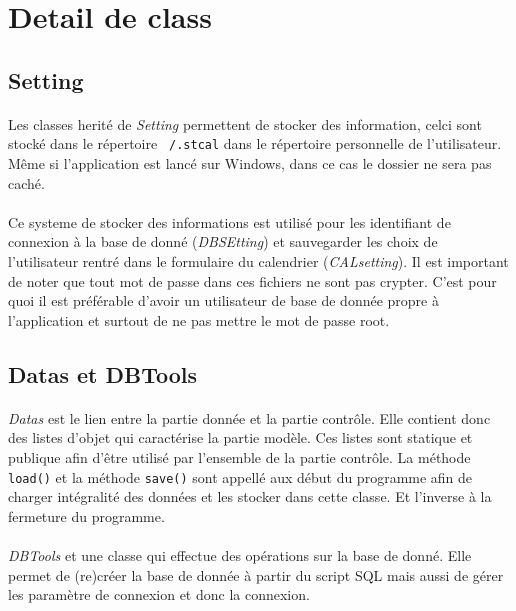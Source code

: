 \documentclass[a4paper,10pt]{report}
\begin{document}
	\section{Detail de class}

		\subsection{Setting}

			\paragraph*{}
			Les classes herité de \textit{Setting} permettent de stocker des information, celci sont stocké dans le répertoire \texttt{~/.stcal} dans le répertoire personnelle de l'utilisateur. Même si l'application est lancé sur Windows, dans ce cas le dossier ne sera pas caché.
			
			\paragraph*{}
			Ce systeme de stocker des informations est utilisé pour les identifiant de connexion à la base de donné (\textit{DBSEtting}) et sauvegarder les choix de l’utilisateur rentré dans le formulaire du calendrier (\textit{CALsetting}). Il est important de noter que tout mot de passe dans ces fichiers ne sont pas crypter. C'est pour quoi il est préférable d'avoir un utilisateur de base de donnée propre à l'application et surtout de ne pas mettre le mot de passe root.

		\subsection{Datas et DBTools}

			\paragraph*{}
			\textit{Datas} est le lien entre la partie donnée et la partie contrôle. Elle contient donc des listes d’objet qui caractérise la partie modèle. Ces listes sont statique et publique afin d’être utilisé par l’ensemble de la partie contrôle.
			La méthode \texttt{load()} et la méthode \texttt{save()} sont appellé aux début du programme afin de charger intégralité des données et les stocker dans cette classe. Et l'inverse à la fermeture du programme.

			\paragraph*{}
			\textit{DBTools} et une classe qui effectue des opérations sur la base de donné. Elle permet de (re)créer la base de donnée à partir du script SQL mais aussi de gérer les paramètre de connexion et donc la connexion.
\end{document}
